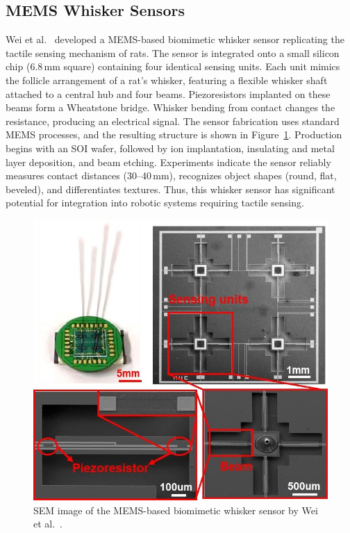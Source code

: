 \subsection{MEMS Whisker Sensors}
Wei et al.~\cite{9114501} developed a MEMS-based biomimetic whisker sensor replicating the tactile sensing mechanism of rats.
The sensor is integrated onto a small silicon chip (6.8\,mm square) containing four identical sensing units.
Each unit mimics the follicle arrangement of a rat's whisker, featuring a flexible whisker shaft attached to a central hub and four beams.
Piezoresistors implanted on these beams form a Wheatstone bridge.
Whisker bending from contact changes the resistance, producing an electrical signal.
The sensor fabrication uses standard MEMS processes, and the resulting structure is shown in Figure~\ref{fig:mems-whisker}.
Production begins with an SOI wafer, followed by ion implantation, insulating and metal layer deposition, and beam etching.
Experiments indicate the sensor reliably measures contact distances (30--40\,mm), recognizes object shapes (round, flat, beveled), and differentiates textures.
Thus, this whisker sensor has significant potential for integration into robotic systems requiring tactile sensing.

\begin{figure}[htb]
    \centering
    \includegraphics[height=0.4\textheight]{figures/mems-whisker}
    \caption{SEM image of the MEMS-based biomimetic whisker sensor by Wei et al.~\cite{9114501}.}
    \label{fig:mems-whisker}
\end{figure}

